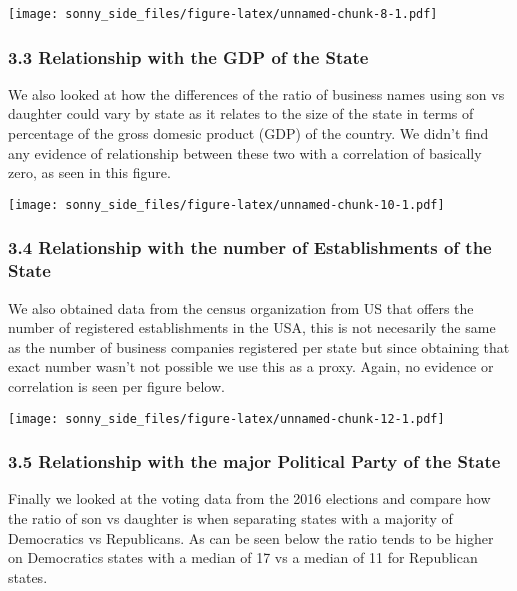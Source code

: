 \documentclass[]{article}
\begin{document}
\texttt{[image: sonny\_side\_files/figure-latex/unnamed-chunk-8-1.pdf]}

\hypertarget{relationship-with-the-gdp-of-the-state}{%
\subsubsection{3.3 Relationship with the GDP of the
State}\label{relationship-with-the-gdp-of-the-state}}

We also looked at how the differences of the ratio of business names
using son vs daughter could vary by state as it relates to the size of
the state in terms of percentage of the gross domesic product (GDP) of
the country. We didn't find any evidence of relationship between these
two with a correlation of basically zero, as seen in this figure.

\texttt{[image: sonny\_side\_files/figure-latex/unnamed-chunk-10-1.pdf]}

\hypertarget{relationship-with-the-number-of-establishments-of-the-state}{%
\subsubsection{3.4 Relationship with the number of Establishments of the
State}\label{relationship-with-the-number-of-establishments-of-the-state}}

We also obtained data from the census organization from US that offers
the number of registered establishments in the USA, this is not
necesarily the same as the number of business companies registered per
state but since obtaining that exact number wasn't not possible we use
this as a proxy. Again, no evidence or correlation is seen per figure
below.

\texttt{[image: sonny\_side\_files/figure-latex/unnamed-chunk-12-1.pdf]}

\hypertarget{relationship-with-the-major-political-party-of-the-state}{%
\subsubsection{3.5 Relationship with the major Political Party of the
State}\label{relationship-with-the-major-political-party-of-the-state}}

Finally we looked at the voting data from the 2016 elections and compare
how the ratio of son vs daughter is when separating states with a
majority of Democratics vs Republicans. As can be seen below the ratio
tends to be higher on Democratics states with a median of 17 vs a median
of 11 for Republican states.
\end{document}
